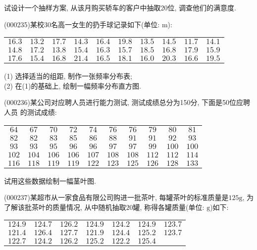 试设计一个抽样方案, 从该月购买轿车的客户中抽取20位, 调查他们的满意度.
\item (000235)某校$30$名高一女生的扔手球记录如下(单位: $\text{m}$):
\begin{center}
    \begin{tabular}{cccccccccc}
        $16.3$ & $13.2$ & $17.7$ & $14.3$ & $16.4$ & $19.8$ & $13.5$ & $14.5$ & $11.7$ & $14.1$\\
        $14.8$ & $17.2$ & $13.8$ & $15.4$ & $16.3$ & $15.7$ & $18.5$ & $16.8$ & $17.9$ & $15.9$\\
        $17.6$ & $15.4$ & $16.8$ & $21.4$ & $16.5$ & $18.1$ & $16.0$ & $20.3$ & $16.6$ & $19.5$
    \end{tabular}
\end{center}
(1) 选择适当的组距, 制作一张频率分布表;\\
(2) 在(1)的基础上, 绘制一幅频率分布直方图.
\item (000236)某公司对应聘人员进行能力测试, 测试成绩总分为150分, 下面是50位应聘人员
的测试成绩:
\begin{center}
    \begin{tabular}{cccccccccc}
        $64$ & $67$ & $70$ & $72$ & $74$ & $76$ & $76$ & $79$ & $80$ & $81$ \\
        $82$ & $82$ & $83$ & $85$ & $86$ & $88$ & $91$ & $91$ & $92$ & $93$ \\
        $93$ & $93$ & $95$ & $96$ & $96$ & $97$ & $97$ & $99$ & $100$ & $100$ \\
        $102$ & $104$ & $106$ & $106$ & $107$ & $108$ & $108$ & $112$ & $112$ & $114$ \\
        $116$ & $118$ & $119$ & $119$ & $122$ & $123$ & $125$ & $126$ & $128$ & $133$
    \end{tabular}
\end{center}
试用这些数据绘制一幅茎叶图.
\item (000237)某超市从一家食品有限公司购进一批茶叶, 每罐茶叶的标准质量是$125\text{g}$, 为了解该批茶叶的质量情况, 从中随机抽取$20$罐, 称得各罐质量(单位: $\text{g}$)如下:
\begin{center}
    \begin{tabular}{ccccccc}
        $124.9$ & $124.7$ & $126.2$ & $124.9$ & $124.2$ & $124.9$ & $123.7$ \\
        $121.4$ & $126.4$ & $127.7$ & $121.9$ & $124.4$ & $125.2$ & $123.7$ \\
        $122.7$ & $124.2$ & $126.2$ & $125.2$ & $122.2$ & $125.4$
    \end{tabular}
\end{center}
